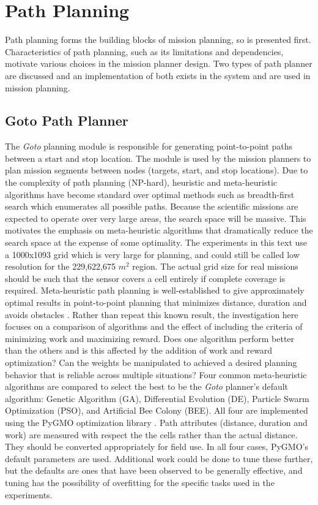 \documentclass{tamuccthesis}
\begin{document}
\section{Path Planning}

Path planning forms the building blocks of mission planning, so is presented first. Characteristics of path planning, such as its limitations and dependencies, motivate various choices in the mission planner design. Two types of path planner are discussed and an implementation of both exists in the system and are used in mission planning.

\subsection{Goto Path Planner} \label{section:goto}

The \textit{Goto} planning module is responsible for generating point-to-point paths between a start and stop location. The module is used by the mission planners to plan mission segments between nodes (targets, start, and stop locations). Due to the complexity of path planning (NP-hard), heuristic and meta-heuristic algorithms have become standard over optimal methods such as breadth-first search which enumerates all possible paths. Because the scientific missions are expected to operate over very large areas, the search space will be massive. This motivates the emphasis on meta-heuristic algorithms that dramatically reduce the search space at the expense of some optimality. The experiments in this text use a 1000x1093 grid which is very large for planning, and could still be called low resolution for the 229,622,675 $m^2$ region. The actual grid size for real missions should be such that the sensor covers a cell entirely if complete coverage is required. Meta-heuristic path planning is well-established to give approximately optimal results in point-to-point planning that minimizes distance, duration and avoids obstacles \cite{hussein2012}. Rather than repeat this known result, the investigation here focuses on a comparison of algorithms and the effect of including the criteria of minimizing work and maximizing reward. Does one algorithm perform better than the others and is this affected by the addition of work and reward optimization? Can the weights be manipulated to achieved a desired planning behavior that is reliable across multiple situations? Four common meta-heuristic algorithms are compared to select the best to be the \textit{Goto} planner's default algorithm: Genetic Algorithm (GA), Differential Evolution (DE), Particle Swarm Optimization (PSO), and Artificial Bee Colony (BEE). All four are implemented using the PyGMO optimization library \cite{PyGMO}. Path attributes (distance, duration and work) are measured with respect the the cells rather than the actual distance. They should be converted appropriately for field use. In all four cases, PyGMO's default parameters are used. Additional work could be done to tune these further, but the defaults are ones that have been observed to be generally effective, and tuning has the possibility of overfitting for the specific tasks used in the experiments. 
\end{document}
